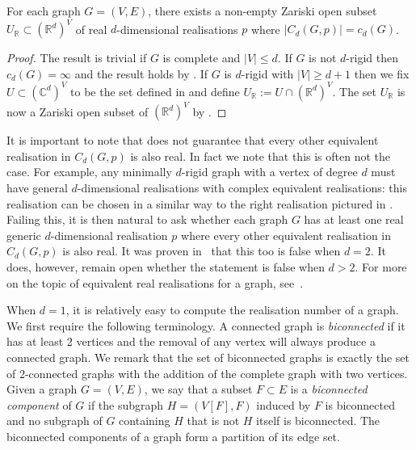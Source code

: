 \documentclass[ALCO]{cedram}
\begin{document}
\begin{corollary}\label{cor:realstuff}
	For each graph $G=(V,E)$,
	there exists a non-empty Zariski open subset $U_\mathbb{R} \subset (\mathbb{R}^d)^V$ of real $d$-dimensional realisations $p$ where $|C_d(G,p)| = c_d(G)$.
\end{corollary}

\begin{proof}
	The result is trivial if $G$ is complete and $|V| \leq d$.	
	If $G$ is not $d$-rigid then $c_d(G) = \infty$ and the result holds by .
	If $G$ is $d$-rigid with $|V| \geq d+1$ then we fix $U \subset (\mathbb{C}^d)^V$ to be the set defined in  and define $U_{\mathbb{R}} := U \cap (\mathbb{R}^d)^V$.
	The set $U_{\mathbb{R}}$ is now a Zariski open subset of $(\mathbb{R}^d)^V$ by .
\end{proof}

It is important to note that  does not guarantee that every other equivalent realisation in $C_d(G,p)$ is also real.
In fact we note that this is often not the case.
For example, any minimally $d$-rigid graph with a vertex of degree $d$ must have general $d$-dimensional realisations with complex equivalent realisations:
this realisation can be chosen in a similar way to the right realisation pictured in .
Failing this,
it is then natural to ask whether each graph $G$ has at least one real generic $d$-dimensional realisation $p$ where every other equivalent realisation in $C_d(G,p)$ is also real.
It was proven in~\cite{JacksonOwen} that this too is false when $d=2$.
It does, however, remain open whether the statement is false when $d>2$.
For more on the topic of equivalent real realisations for a graph,
see~\cite{Bartzos2021}.


When $d=1$, it is relatively easy to compute the realisation number of a graph.
We first require the following terminology.
A connected graph is \emph{biconnected} if it has at least 2 vertices and the removal of any vertex will always produce a connected graph.
We remark that the set of biconnected graphs is exactly the set of 2-connected graphs with the addition of the complete graph with two vertices.
Given a graph $G=(V,E)$, we say that a subset $F \subset E$ is a \emph{biconnected component} of $G$ if the subgraph $H=(V[F],F)$ induced by $F$ is biconnected and no subgraph of $G$ containing $H$ that is not $H$ itself is biconnected.
The biconnected components of a graph form a partition of its edge set.
\end{document}
